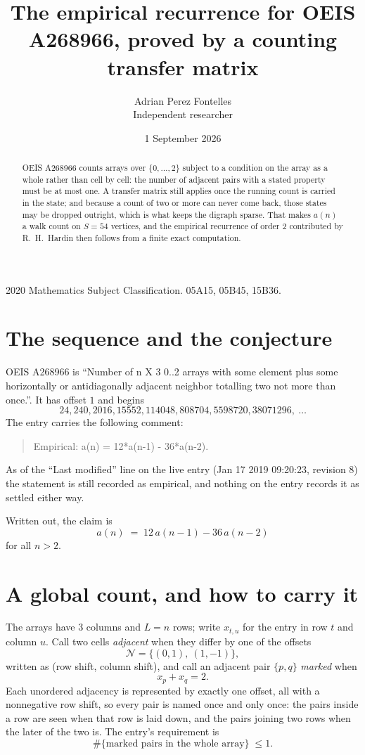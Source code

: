 \documentclass[11pt,a4paper]{article}
\title{The empirical recurrence for OEIS A268966, proved by a counting transfer matrix}
\author{Adrian Perez Fontelles\\ \small Independent researcher}
\date{1 September 2026}
\theoremstyle{plain}
\theoremstyle{definition}
\begin{document}
\maketitle

\begin{abstract}
OEIS A268966 counts arrays over $\{0,\dots,2\}$ subject to a condition on the array as a
whole rather than cell by cell: the number of adjacent pairs with a stated property must be
at most one. A transfer matrix still applies once the running count is carried in the state; and
because a count of two or more can never come back, those states may be dropped outright,
which is what keeps the digraph sparse. That makes $a(n)$ a walk count on $S=54$ vertices,
and the empirical recurrence of order $2$ contributed by R.~H.~Hardin then follows from
a finite exact computation.
\end{abstract}

\noindent\small 2020 Mathematics Subject Classification. 05A15, 05B45, 15B36.\normalsize

\section{The sequence and the conjecture}

OEIS A268966 is ``Number of n X 3 0..2 arrays with some element plus some horizontally or antidiagonally adjacent neighbor totalling two not more than once.''. It has offset $1$ and begins
\[
24, 240, 2016, 15552, 114048, 808704, 5598720, 38071296,\ \dots
\]
The entry carries the following comment:
\begin{quote}\small
Empirical: a(n) = 12*a(n-1) - 36*a(n-2).
\end{quote}
As of the ``Last modified'' line on the live entry (Jan 17 2019 09:20:23, revision 8) the statement is
still recorded as empirical, and nothing on the entry records it as settled either way.

Written out, the claim is
\begin{equation}\label{eq:conj}
a(n)\;=\;12\,a(n-1) - 36\,a(n-2)
\end{equation}
for all $n>2$.

\section{A global count, and how to carry it}

The arrays have $3$ columns and $L=n$ rows; write $x_{t,u}$ for the entry in
row $t$ and column $u$. Call two cells \emph{adjacent} when they differ by one of the
offsets
\[
\mathcal N=\{(0,1),\ (1,-1)\},
\]
written as (row shift, column shift), and call an adjacent pair $\{p,q\}$
\emph{marked} when
\[
x_{p}+x_{q}=2 .
\]
Each unordered adjacency is represented by exactly one offset, all with a nonnegative row
shift, so every pair is named once and only once: the pairs inside a row are seen when
that row is laid down, and the pairs joining two rows when the later of the two is. The
entry's requirement is
\begin{equation}\label{eq:glob}
\#\{\text{marked pairs in the whole array}\}\;\le1.
\end{equation}
\end{document}
